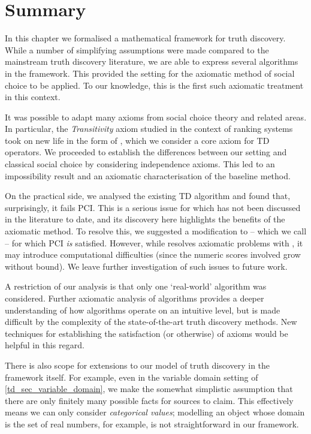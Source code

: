 \section{Summary}
\label{td_sec_conclusion}

In this chapter we formalised a mathematical framework for truth discovery. While
a number of simplifying assumptions were made compared to the mainstream truth
discovery literature, we are able to express several algorithms in the
framework. This provided the setting for the axiomatic method of social choice
to be applied. To our knowledge, this is the first such axiomatic treatment in
this context.

It was possible to adapt many axioms from social choice theory and related
areas. In particular, the \emph{Transitivity} axiom studied in the context of
ranking systems~\cite{tennenholtz2004,altman2008} took on new life in the form
of \coherence{}, which we consider a core axiom for TD operators.
We proceeded to establish the differences between our setting and classical
social choice by considering independence axioms. This led to an impossibility
result and an axiomatic characterisation of the baseline \voting{} method.

On the practical side, we analysed the existing TD algorithm \sums{} and found
that, surprisingly, it fails PCI. This is a serious issue for \sums{} which has
not been discussed in the literature to date, and its discovery here highlights
the benefits of the axiomatic method. To resolve this, we suggested a
modification to \sums{} -- which we call \usums{} -- for which PCI \emph{is}
satisfied. However, while \usums{} resolves axiomatic problems with \sums{}, it
may introduce computational difficulties (since the numeric scores involved
grow without bound). We leave further investigation of such issues to future
work.

A restriction of our analysis is that only one `real-world' algorithm was
considered. Further axiomatic analysis of algorithms provides a deeper
understanding of how algorithms operate on an intuitive level, but is made
difficult by the complexity of the state-of-the-art truth discovery methods.
New techniques for establishing the satisfaction (or otherwise) of axioms would
be helpful in this regard.

There is also scope for extensions to our model of truth discovery in the
framework itself. For example, even in the variable domain setting of
\cref{td_sec_variable_domain}, we make the somewhat simplistic assumption that
there are only finitely many possible facts for sources to claim. This
effectively means we can only consider \emph{categorical values}; modelling an
object whose domain is the set of real numbers, for example, is not
straightforward in our framework.

